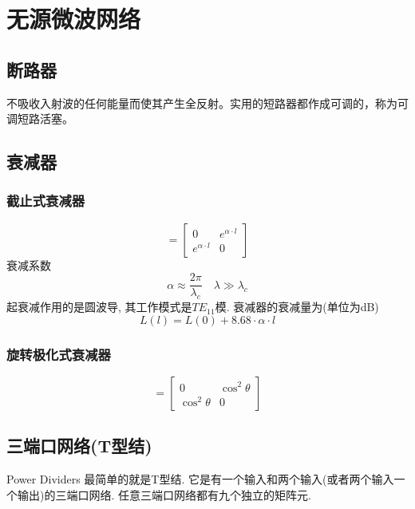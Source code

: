 \documentclass[a4paper]{report}
\begin{document}
\chapter{无源微波网络}
\section{断路器}
不吸收入射波的任何能量而使其产生全反射。实用的短路器都作成可调的，称为可调短路活塞。
\section{衰减器}
\subsection{截止式衰减器}
\begin{equation}
  [s]=\begin{bmatrix}
    0& e^{\alpha\cdot l}
    \\ e^{\alpha\cdot l}&0
  \end{bmatrix}
\end{equation}
衰减系数$$\alpha\approx\frac{2\pi}{\lambda_c}\quad \lambda\gg\lambda_c$$
起衰减作用的是圆波导, 其工作模式是$TE_{11}$模. 
衰减器的衰减量为(单位为dB)
$$L(l)=L(0)+8.68\cdot\alpha\cdot l$$
\subsection{旋转极化式衰减器}
\begin{equation}
  [s]=\begin{bmatrix}
    0&\cos^2{\theta}
    \\ \cos^2{\theta}&0
  \end{bmatrix}
\end{equation}

\section{三端口网络(T型结)}
Power Dividers 最简单的就是T型结. 它是有一个输入和两个输入(或者两个输入一个输出)的三端口网络. 
任意三端口网络都有九个独立的矩阵元. 
\end{document}
